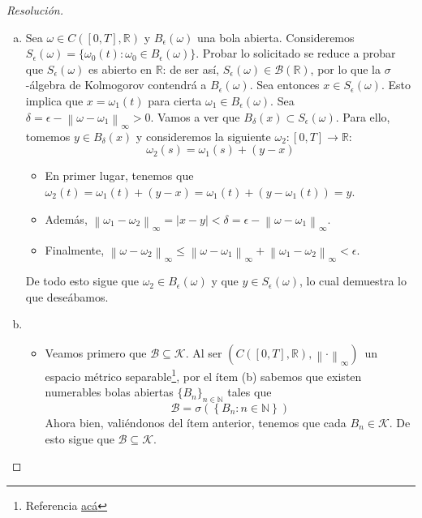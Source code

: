 \documentclass[a4paper,11pt]{article}
\newcommand{\norm}[1]{\left\lVert#1\right\rVert}
\newcommand{\normi}[1]{\norm{#1}_{\infty}}
\newcommand{\CT}{\ensuremath{C([0,T], \mathbb{R})}}
\newcommand{\CTesp}{\ensuremath{(C([0,T], \mathbb{R}), \norm{\cdot}_{\infty})}}
\newcommand{\Bor}[1]{\ensuremath{\mathcal{B}(#1)}}
\newcommand{\Bola}[2]{\ensuremath{B_{#2}(#1)}}
\begin{document}
\begin{proof}[Resoluci\'on]
\begin{enumerate}[a)]
    \item Sea $\omega \in \CT$ y \Bola{\omega}{\epsilon} una bola abierta.
    Consideremos
    $S_{\epsilon}(\omega) = \{ \omega_0(t) : \omega_0 \in \Bola{\omega}{\epsilon} \}$.
    Probar lo solicitado se reduce a probar que $S_{\epsilon}(\omega)$
    es abierto en $\mathbb{R}$: de ser así, $S_{\epsilon}(\omega) \in \Bor{\mathbb{R}}$,
    por lo que la $\sigma$-álgebra de Kolmogorov contendrá a \Bola{\omega}{\epsilon}.
    Sea entonces $x \in S_{\epsilon}(\omega)$. Esto implica que $x = \omega_1(t)$ para
    cierta $\omega_1 \in \Bola{\omega}{\epsilon}$. Sea
    $\delta = \epsilon - \normi{\omega - \omega_1} > 0$. Vamos a ver que 
    $\Bola{x}{\delta} \subset S_{\epsilon}(\omega)$. Para ello, tomemos
    $y \in \Bola{x}{\delta}$ y consideremos la siguiente $\omega_2 : [0,T] \to \mathbb{R}$:
    $$\omega_2(s) = \omega_1(s) + (y - x)$$
    \begin{itemize}
        \item En primer lugar, tenemos que $\omega_2(t) = \omega_1(t) + (y - x)
        = \omega_1(t) + (y - \omega_1(t)) = y$.
        \item Además, $\normi{\omega_1 - \omega_2} = |x - y| < \delta = \epsilon - \normi{\omega - \omega_1}$.
        \item Finalmente, $\normi{\omega - \omega_2} \leq \normi{\omega - \omega_1} + \normi{\omega_1 - \omega_2}
        < \epsilon$.
    \end{itemize}
    De todo esto sigue que $\omega_2 \in \Bola{\omega}{\epsilon}$ y que $y \in S_{\epsilon}(\omega)$,
    lo cual demuestra lo que deseábamos.

    \item
        \begin{itemize}
            \item Veamos primero que $\mathcal{B} \subseteq \mathcal{K}$.
            Al ser \CTesp \, un espacio métrico separable\footnote{Referencia 
            \href{http://mathoverflow.net/questions/46011/is-the-space-of-continuous-functions-from-a-compact-metric-space-into-a-polish-s}{acá}},
            por el ítem (b) sabemos que existen numerables bolas abiertas $\{B_n\}_{n \in \mathbb{N}}$ tales que
            $$\mathcal{B} = \sigma\left(\left\{B_n : n \in \mathbb{N}\right\}\right)$$
            Ahora bien, valiéndonos del ítem anterior, tenemos que cada $B_n \in \mathcal{K}$.
            De esto sigue que $\mathcal{B} \subseteq \mathcal{K}$.


\end{itemize}
\end{enumerate}
\end{proof}
\end{document}
